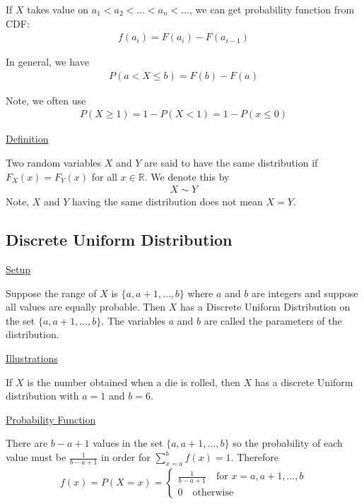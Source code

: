 \documentclass{article}
\begin{document}
If $X$ takes value on $a_1 < a_2 < \ldots < a_n < \ldots$, we can get probability function from CDF:
\begin{align*}
    f(a_i) = F(a_i) - F(a_{i-1})
\end{align*}

In general, we have
\begin{align*}
    P(a<X\le b) = F(b) - F(a)
\end{align*}

Note, we often use
\begin{align*}
    P(X \ge 1) = 1 - P(X < 1) = 1-P(x \le 0)
\end{align*}

\underline{Definition}

Two random variables $X$ and $Y$ are said to have the same distribution if $F_X(x) = F_Y(x)$ for all $x \in \mathbb{R}$. We denote this by
\begin{align*}
    X \sim Y
\end{align*}
Note, $X$ and $Y$ having the same distribution does not mean $X = Y$.

\subsection{Discrete Uniform Distribution}

\underline{Setup}

Suppose the range of $X$ is $\{a,a+1,\ldots,b\}$ where $a$ and $b$ are integers and suppose all values are equally probable. Then $X$ has a Discrete Uniform Distribution on the set $\{a,a+1,\ldots,b\}$. The variables $a$ and $b$ are called the parameters of the distribution. 

\underline{Illustrations}

If $X$ is the number obtained when a die is rolled, then $X$ has a discrete Uniform distribution with $a = 1$ and $b = 6$.

\underline{Probability Function}

There are $b-a+1$ values in the set $\{a,a+1,\ldots,b\}$ so the probability of each value must be $\frac{1}{b-a+1}$ in order for $\sum_{x=a}^bf(x) = 1$. Therefore
\begin{align*}
    f(x) = P(X=x) = \begin{cases}
        \frac{1}{b-a+1} \quad \text{for } x = a,a+1,\ldots,b\\
        0 \quad \text{otherwise}
    \end{cases}
\end{align*}
\end{document}
